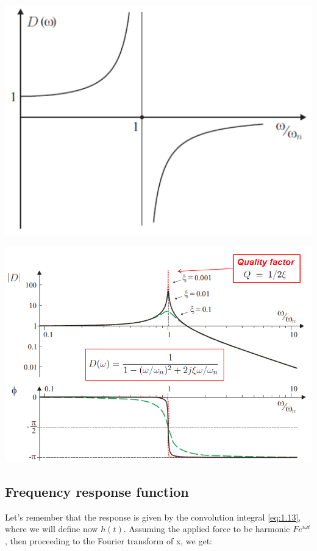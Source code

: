 			\begin{center}
			\begin{minipage}{0.4\textwidth}
			\includegraphics[scale=0.4]{ch1/9}
			\end{minipage}
			\begin{minipage}{0.4\textwidth}
			\includegraphics[scale=0.24]{ch1/10}
			\end{minipage}
			\end{center}
			
		\subsection{Frequency response function}
			Let's remember that the response is given by the convolution integral \eqref{eq:1.13}, where we will define now $h(t)$. Assuming the applied force to be harmonic $Fe^{i\omega t}$, then proceeding to the Fourier transform of x, we get:
			
